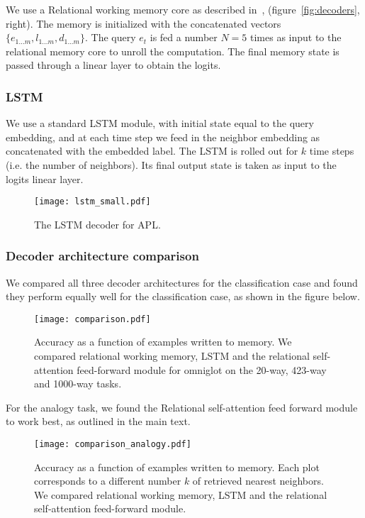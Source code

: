 \documentclass{article} \usepackage{iclr2019_conference,times}
\begin{document}
We use a Relational working memory core as described in~\citep{santoro2018relational}, (figure~\ref{fig:decoders}, right). The memory is initialized with the concatenated vectors $\{e_{1...m}, l_{1...m}, d_{1...m}\}$. The query $e_t$ is fed a number $N=5$ times as input to the relational memory core to unroll the computation. The final memory state is passed through a linear layer to obtain the logits. 

\subsubsection{LSTM}

We use a standard LSTM module, with initial state equal to the query embedding, and at each time step we feed in the neighbor embedding as concatenated with the embedded label. The LSTM is rolled out for $k$ time steps (i.e. the number of neighbors). Its final output state is taken as input to the logits linear layer.

\begin{figure}[ht]
    \centering
    \texttt{[image: lstm\_small.pdf]}
    \caption{The LSTM decoder for APL.}
    \label{fig:lstm}

\end{figure}

\subsubsection{Decoder architecture comparison}

We compared all three decoder architectures for the classification case and found they perform equally well for the classification case, as shown in the figure below.

\begin{figure}[ht!]
\begin{center}
\texttt{[image: comparison.pdf]}
\end{center}
\caption{Accuracy as a function of examples written to memory. We compared relational working memory, LSTM and the relational self-attention feed-forward module for omniglot on the 20-way, 423-way and 1000-way tasks.}
\end{figure}

For the analogy task, we found the Relational self-attention feed forward module to work best, as outlined in the main text.

\begin{figure}[ht!]
\begin{center}
\texttt{[image: comparison\_analogy.pdf]}
\end{center}
\caption{Accuracy as a function of examples written to memory. Each plot corresponds to a different number $k$ of retrieved nearest neighbors. We compared relational working memory, LSTM and the relational self-attention feed-forward module.}
\end{figure}
\end{document}
